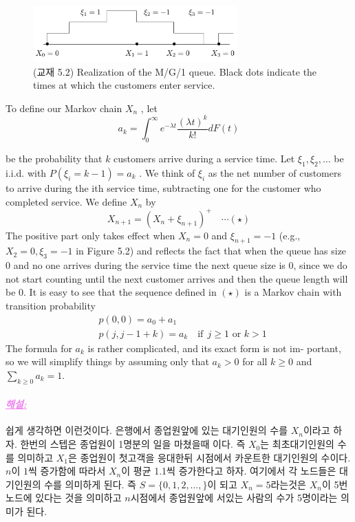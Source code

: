 \documentclass[12pt,oneside,english,a4paper]{article}
\newcommand{\paraviolet}[1]{\paragraph{\LARGE\textcolor{violet}{\it\underline{\textbf{#1:}}}}\LARGE}
\begin{document}
\begin{figure}[ht]
\center
\includegraphics[width=0.7\textwidth]{Fig52.png}
\caption{(교재 5.2) Realization of the M/G/1 queue. Black dots indicate the times at which the customers enter service.}
\end{figure}

To define our Markov chain $X_n$ , let 
\[
a_k=\int_0^{\infty}e^{-\lambda t }\frac{(\lambda t)^k}{k!}dF(t)
\]

be the probability that $k$ customers arrive during a service time. Let
$\xi_1,\xi_2,\dots$ be i.i.d. with $P(\xi_i = k - 1) = a_k$ . We think of $\xi_i$ as the net number of customers to arrive during the ith service time, subtracting one for the customer who completed service. We define $X_n$ by
\[
X_{n+1}=(X_n+\xi_{n+1})^+ \quad \cdots (\star)
\]
The positive part only takes effect when $X_n = 0$ and $\xi_{n+1} = -1$ (e.g., $X_2 = 0, \xi_3 = −1$ in Figure 5.2) and reflects the fact that when the queue has size $0$ and no one arrives during the service time the next queue size is $0$, since we do not start counting until the next customer arrives and then the queue length will be $0$. 
It is easy to see that the sequence defined in $(\star)$ is a Markov chain
with transition probability
\begin{align*}
& p(0,0)=a_0+a_1 \\ 
& p(j,j-1+k)=a_k \quad \mbox{if}~~ j\geq1 \mbox{ or } k>1
\end{align*}
The formula for $a_k$ is rather complicated, and its exact form is not im-
portant, so we will simplify things by assuming only that $a_k > 0$ for all $k \geq 0$ and $\sum_{k\geq 0}a_k = 1$. 

\paraviolet{해설} 쉽게 생각하면 이런것이다. 은행에서 종업원앞에 있는 대기인원의 수를 $X_n$이라고 하자. 한번의 스텝은 종업원이 1명분의 일을 마쳤을때 이다. 즉 $X_0$는 최초대기인원의 수를 의미하고 $X_1$은 종업원이 첫고객을 응대한뒤 시점에서 카운트한 대기인원의 수이다. $n$이 $1$씩 증가함에 따라서 $X_n$이 평균 1.1씩 증가한다고 하자. 여기에서 각 노드들은 대기인원의 수를 의미하게 된다. 즉 $S=\{0,1,2,\dots,\}$이 되고 $X_n=5$라는것은 $X_n$이 5번노드에 있다는 것을 의미하고 $n$시점에서 종업원앞에 서있는 사람의 수가 5명이라는 의미가 된다. 
\end{document}
